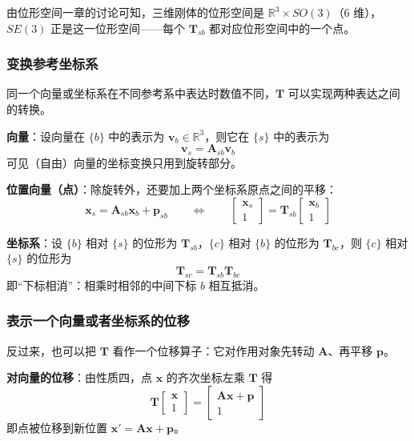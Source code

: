 由位形空间一章的讨论可知，三维刚体的位形空间是 $\mathbb{R}^{3}\times SO(3)$（6 维），$SE(3)$ 正是这一位形空间——每个 $\boldsymbol{T}_{sb}$ 都对应位形空间中的一个点。

\subsubsection{变换参考坐标系}

同一个向量或坐标系在不同参考系中表达时数值不同，$\boldsymbol{T}$ 可以实现两种表达之间的转换。

\textbf{向量}：设向量在 $\{b\}$ 中的表示为 $\boldsymbol{v}_{b}\in\mathbb{R}^{3}$，则它在 $\{s\}$ 中的表示为
\begin{equation}
	\label{eq:用途:向量变换}
	\boldsymbol{v}_{s}=\boldsymbol{A}_{sb}\boldsymbol{v}_{b}
\end{equation}
可见（自由）向量的坐标变换只用到旋转部分。

\textbf{位置向量（点）}：除旋转外，还要加上两个坐标系原点之间的平移：
\begin{equation}
	\label{eq:用途:点变换}
	\boldsymbol{x}_{s}=\boldsymbol{A}_{sb}\boldsymbol{x}_{b}+\boldsymbol{p}_{sb}
	\qquad\Longleftrightarrow\qquad
	\begin{bmatrix}
		\boldsymbol{x}_{s}\\
		1
	\end{bmatrix}=\boldsymbol{T}_{sb}\begin{bmatrix}
		\boldsymbol{x}_{b}\\
		1
	\end{bmatrix}
\end{equation}

\textbf{坐标系}：设 $\{b\}$ 相对 $\{s\}$ 的位形为 $\boldsymbol{T}_{sb}$，$\{c\}$ 相对 $\{b\}$ 的位形为 $\boldsymbol{T}_{bc}$，则 $\{c\}$ 相对 $\{s\}$ 的位形为
\begin{equation}
	\label{eq:用途:坐标系复合}
	\boldsymbol{T}_{sc}=\boldsymbol{T}_{sb}\boldsymbol{T}_{bc}
\end{equation}
即“下标相消”：相乘时相邻的中间下标 $b$ 相互抵消。

\subsubsection{表示一个向量或者坐标系的位移}

反过来，也可以把 $\boldsymbol{T}$ 看作一个位移算子：它对作用对象先转动 $\boldsymbol{A}$、再平移 $\boldsymbol{p}$。

\textbf{对向量的位移}：由性质四，点 $\boldsymbol{x}$ 的齐次坐标左乘 $\boldsymbol{T}$ 得
\begin{equation}
	\label{eq:用途:位移}
	\boldsymbol{T}\begin{bmatrix}
		\boldsymbol{x}\\
		1
	\end{bmatrix}=\begin{bmatrix}
		\boldsymbol{A}\boldsymbol{x}+\boldsymbol{p}\\
		1
	\end{bmatrix}
\end{equation}
即点被位移到新位置 $\boldsymbol{x}'=\boldsymbol{A}\boldsymbol{x}+\boldsymbol{p}$。

